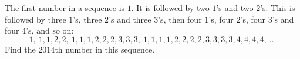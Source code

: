 The first number in a sequence is $1$. It is followed by two $1$'s and two $2$'s. This is followed by three $1$'s, three $2$'s and three $3$'s, then four $1$'s, four $2$'s, four $3$'s and four $4$'s, and so on:
\[
1,\ 1,1,2,2,\ 1,1,1,2,2,2,3,3,3,\ 1,1,1,1,2,2,2,2,3,3,3,3,4,4,4,4,\ \dots
\]
Find the $2014$th number in this sequence.
